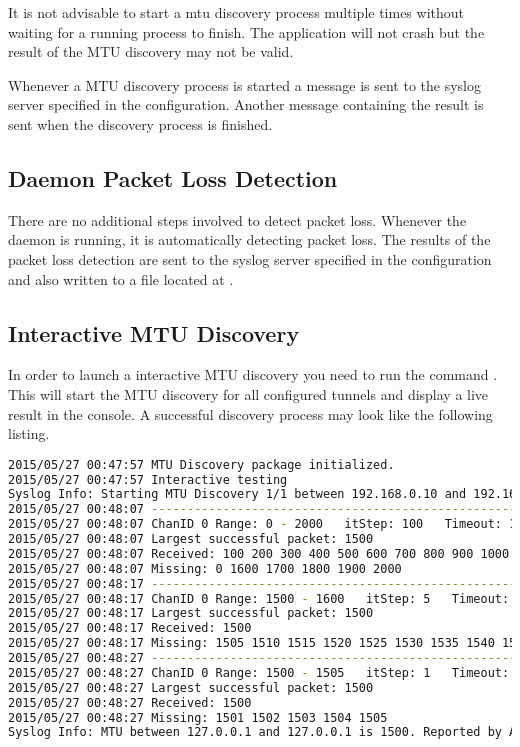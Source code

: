 It is not advisable to start a mtu discovery process multiple times without waiting for a running process to finish. The application will not crash but the result of the \acs{MTU} discovery may not be valid.

Whenever a \acs{MTU} discovery process is started a message is sent to the syslog server specified in the configuration. Another message containing the result is sent when the discovery process is finished.

\subsection{Daemon Packet Loss Detection}
There are no additional steps involved to detect packet loss. Whenever the daemon is running, it is automatically detecting packet loss. The results of the packet loss detection are sent to the syslog server specified in the configuration and also written to a file located at .

\subsection{Interactive MTU Discovery}
In order to launch a interactive \acs{MTU} discovery you need to run the command . This will start the \acs{MTU} discovery for all configured tunnels and display a live result in the console. A successful discovery process may look like the following listing.

\begin{lstlisting}[language=bash, caption=Successful MTU Discovery]
2015/05/27 00:47:57 MTU Discovery package initialized.
2015/05/27 00:47:57 Interactive testing
Syslog Info: Starting MTU Discovery 1/1 between 192.168.0.10 and 192.168.0.11. Reported by AppID 97691.
2015/05/27 00:48:07 ---------------------------------------------------
2015/05/27 00:48:07 ChanID 0 Range: 0 - 2000   itStep: 100   Timeout: 10ns
2015/05/27 00:48:07 Largest successful packet: 1500
2015/05/27 00:48:07 Received: 100 200 300 400 500 600 700 800 900 1000 1100 1200 1300 1400 1500 
2015/05/27 00:48:07 Missing: 0 1600 1700 1800 1900 2000 
2015/05/27 00:48:17 ---------------------------------------------------
2015/05/27 00:48:17 ChanID 0 Range: 1500 - 1600   itStep: 5   Timeout: 10ns
2015/05/27 00:48:17 Largest successful packet: 1500
2015/05/27 00:48:17 Received: 1500 
2015/05/27 00:48:17 Missing: 1505 1510 1515 1520 1525 1530 1535 1540 1545 1550 1555 1560 1565 1570 1575 1580 1585 1590 1595 1600 
2015/05/27 00:48:27 ---------------------------------------------------
2015/05/27 00:48:27 ChanID 0 Range: 1500 - 1505   itStep: 1   Timeout: 10ns
2015/05/27 00:48:27 Largest successful packet: 1500
2015/05/27 00:48:27 Received: 1500 
2015/05/27 00:48:27 Missing: 1501 1502 1503 1504 1505 
Syslog Info: MTU between 127.0.0.1 and 127.0.0.1 is 1500. Reported by AppID 97691.
\end{lstlisting}

